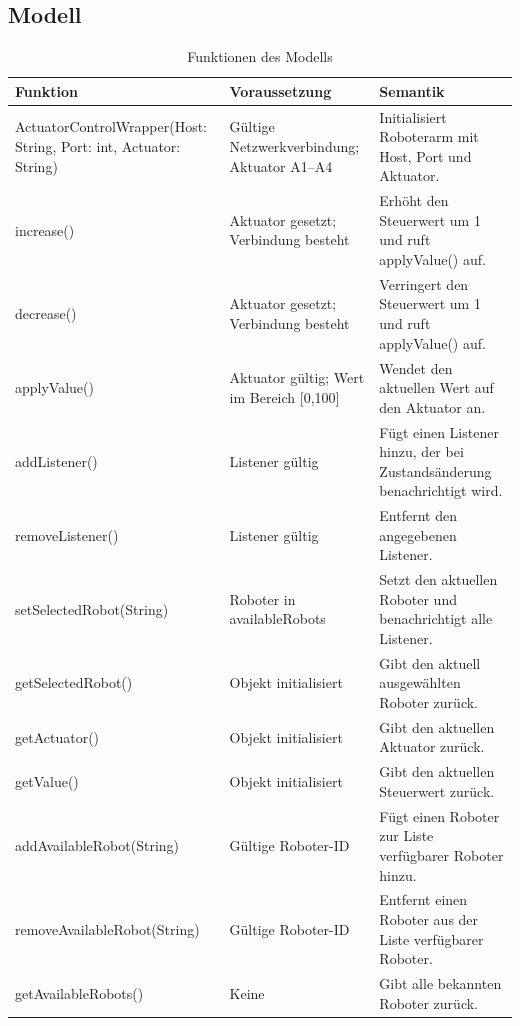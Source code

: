 \subsection{Modell}
\begin{table}[h!]
    \centering
    \begin{tabular}{|p{5cm}|p{5cm}|p{5cm}|}
        \hline
        \textbf{Funktion} & \textbf{Voraussetzung} & \textbf{Semantik} \\
        \hline
        ActuatorControlWrapper(Host: String, Port: int, Actuator: String) & Gültige Netzwerkverbindung; Aktuator A1–A4 & Initialisiert Roboterarm mit Host, Port und Aktuator. \\
        \hline
        increase() & Aktuator gesetzt; Verbindung besteht & Erhöht den Steuerwert um 1 und ruft applyValue() auf. \\
        \hline
        decrease() & Aktuator gesetzt; Verbindung besteht & Verringert den Steuerwert um 1 und ruft applyValue() auf. \\
        \hline
        applyValue() & Aktuator gültig; Wert im Bereich [0,100] & Wendet den aktuellen Wert auf den Aktuator an. \\
        \hline
        addListener() & Listener gültig & Fügt einen Listener hinzu, der bei Zustandsänderung benachrichtigt wird. \\
        \hline
        removeListener() & Listener gültig & Entfernt den angegebenen Listener. \\
        \hline
        setSelectedRobot(String) & Roboter in availableRobots & Setzt den aktuellen Roboter und benachrichtigt alle Listener. \\
        \hline
        getSelectedRobot() & Objekt initialisiert & Gibt den aktuell ausgewählten Roboter zurück. \\
        \hline
        getActuator() & Objekt initialisiert & Gibt den aktuellen Aktuator zurück. \\
        \hline
        getValue() & Objekt initialisiert & Gibt den aktuellen Steuerwert zurück. \\
        \hline
        addAvailableRobot(String) & Gültige Roboter-ID & Fügt einen Roboter zur Liste verfügbarer Roboter hinzu. \\
        \hline
        removeAvailableRobot(String) & Gültige Roboter-ID & Entfernt einen Roboter aus der Liste verfügbarer Roboter. \\
        \hline
        getAvailableRobots() & Keine & Gibt alle bekannten Roboter zurück. \\
        \hline
    \end{tabular}
    \caption{Funktionen des Modells}
    \label{tab:Methodenbeschreibung}
\end{table}

